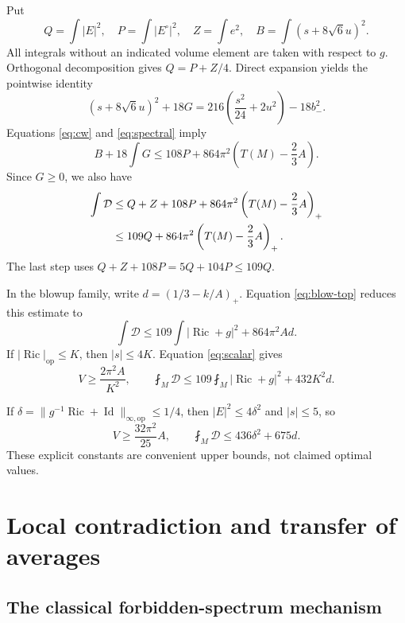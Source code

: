 \documentclass[a4paper,11pt]{article}
\theoremstyle{paper}
\DeclareMathOperator{\Ric}{Ric}
\DeclareMathOperator{\Id}{Id}
\newcommand{\op}{\mathrm{op}}
\newcommand{\av}{\fint}
\newcommand{\Dcal}{\mathcal D}
\numberwithin{equation}{section}
\begin{document}
Put
\[
Q=\int|E|^2,\quad P=\int|E^\circ|^2,\quad
Z=\int e^2,\quad B=\int(s+8\sqrt6u)^2.
\]
All integrals without an indicated volume element are taken with respect to $g$. Orthogonal decomposition gives $Q=P+Z/4$. Direct expansion yields the pointwise identity
\begin{equation}\label{eq:calibration}
(s+8\sqrt6u)^2+18G
=216\left(\frac{s^2}{24}+2u^2\right)-18b_-^2.
\end{equation}
Equations \eqref{eq:cw} and \eqref{eq:spectral} imply
\begin{equation}\label{eq:budget-raw}
B+18\int G\le108P+864\pi^2\left(T(M)-\frac23A\right).
\end{equation}
Since $G\ge0$, we also have
\begin{align}
\int\Dcal
&\le Q+Z+108P+864\pi^2\left(T(M)-\frac23A\right)_+\notag\\
&\le109Q+864\pi^2\left(T(M)-\frac23A\right)_+.\label{eq:budget-general}
\end{align}
The last step uses $Q+Z+108P=5Q+104P\le109Q$.

In the blowup family, write $d=(1/3-k/A)_+$. Equation \eqref{eq:blow-top} reduces this estimate to
\begin{equation}\label{eq:budget-blow}
\int\Dcal\le109\int|\Ric+g|^2+864\pi^2Ad.
\end{equation}
If $|\Ric|_{\op}\le K$, then $|s|\le4K$. Equation \eqref{eq:scalar} gives
\begin{equation}\label{eq:l2-budget}
V\ge\frac{2\pi^2A}{K^2},\qquad
\av_M\Dcal\le109\av_M|\Ric+g|^2+432K^2d.
\end{equation}

If $\delta=\|g^{-1}\Ric+\Id\|_{\infty,\op}\le1/4$, then $|E|^2\le4\delta^2$ and $|s|\le5$, so
\begin{equation}\label{eq:delta-budget}
V\ge\frac{32\pi^2}{25}A,\qquad
\boxed{\av_M\Dcal\le436\delta^2+675d.}
\end{equation}
These explicit constants are convenient upper bounds, not claimed optimal values.

\section{Local contradiction and transfer of averages}

\subsection{The classical forbidden-spectrum mechanism}
\end{document}
